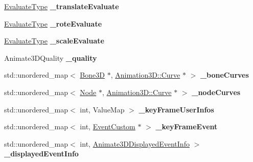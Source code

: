 \begin{DoxyCompactItemize}
\item 
\mbox{\label{classAnimate3D_afabff26944c2fef3be5b67217cdb39df}} 
\hyperlink{group____3d_ga3c41e728b3058f4688800b2d4d1f5c95}{Evaluate\+Type} {\bfseries \+\_\+translate\+Evaluate}
\item 
\mbox{\label{classAnimate3D_a9c2f392ab0dc59f104c823c4209c2061}} 
\hyperlink{group____3d_ga3c41e728b3058f4688800b2d4d1f5c95}{Evaluate\+Type} {\bfseries \+\_\+rote\+Evaluate}
\item 
\mbox{\label{classAnimate3D_a4f9c82b89ff98f58c06e3d9136c993f4}} 
\hyperlink{group____3d_ga3c41e728b3058f4688800b2d4d1f5c95}{Evaluate\+Type} {\bfseries \+\_\+scale\+Evaluate}
\item 
\mbox{\label{classAnimate3D_ad1ae66a8dfffac65d9cc628094394fa1}} 
Animate3\+D\+Quality {\bfseries \+\_\+quality}
\item 
\mbox{\label{classAnimate3D_a2c317ff3e4fd5f045cc3c59ad9df2668}} 
std\+::unordered\+\_\+map$<$ \hyperlink{classBone3D}{Bone3D} $\ast$, \hyperlink{classAnimation3D_1_1Curve}{Animation3\+D\+::\+Curve} $\ast$ $>$ {\bfseries \+\_\+bone\+Curves}
\item 
\mbox{\label{classAnimate3D_a4e35d184d6956e547bd3745dce6cacda}} 
std\+::unordered\+\_\+map$<$ \hyperlink{classNode}{Node} $\ast$, \hyperlink{classAnimation3D_1_1Curve}{Animation3\+D\+::\+Curve} $\ast$ $>$ {\bfseries \+\_\+node\+Curves}
\item 
\mbox{\label{classAnimate3D_a16e55626ebadadbe401b47d340b88f1c}} 
std\+::unordered\+\_\+map$<$ int, Value\+Map $>$ {\bfseries \+\_\+key\+Frame\+User\+Infos}
\item 
\mbox{\label{classAnimate3D_a2224313fac35787933195435abc196e5}} 
std\+::unordered\+\_\+map$<$ int, \hyperlink{classEventCustom}{Event\+Custom} $\ast$ $>$ {\bfseries \+\_\+key\+Frame\+Event}
\item 
\mbox{\label{classAnimate3D_a2dac86682e5ddbbb2e08e8d9958dcdeb}} 
std\+::unordered\+\_\+map$<$ int, \hyperlink{structAnimate3D_1_1Animate3DDisplayedEventInfo}{Animate3\+D\+Displayed\+Event\+Info} $>$ {\bfseries \+\_\+displayed\+Event\+Info}
\end{DoxyCompactItemize}
